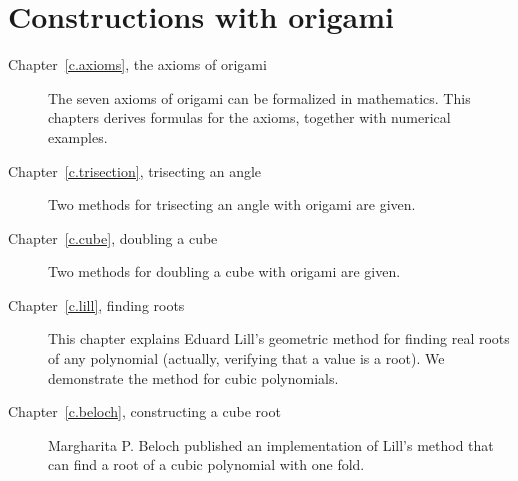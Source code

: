 \section{Constructions with origami}

\begin{description}
\item[Chapter~\ref{c.axioms}, the axioms of origami] The seven axioms of origami can be formalized in mathematics. This chapters derives formulas for the axioms, together with numerical examples.

\item[Chapter~\ref{c.trisection}, trisecting an angle] Two methods for trisecting an angle with origami are given.

\item[Chapter~\ref{c.cube}, doubling a cube] Two methods for doubling a cube with origami are given.

\item[Chapter~\ref{c.lill}, finding roots] This chapter explains Eduard Lill's geometric method for finding real roots of any polynomial (actually, verifying that a value is a root). We demonstrate the method for cubic polynomials.

\item[Chapter~\ref{c.beloch}, constructing a cube root] Margharita P. Beloch published an implementation of Lill's method that can find a root of a cubic polynomial with one fold.

\end{description}
